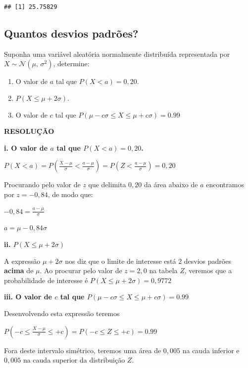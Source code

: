 \documentclass[
]{book}
\providecommand{\tightlist}{%
  \setlength{\itemsep}{0pt}\setlength{\parskip}{0pt}}
\begin{document}
\begin{verbatim}
## [1] 25.75829
\end{verbatim}

\hypertarget{quantos-desvios-padruxf5es}{%
\subsection{Quantos desvios padrões?}\label{quantos-desvios-padruxf5es}}

Suponha uma variável aleatória normalmente distribuída representada por \(X \sim \mathcal{N}(\mu,\,\sigma^2)\), determine:

\begin{enumerate}
\def\labelenumi{\roman{enumi}.}
\tightlist
\item
  O valor de \(a\) tal que \(P(X < a) = 0,20\).
\item
  \(P(X \le \mu + 2\sigma)\).
\item
  O valor de \(c\) tal que \(P(\mu -c\sigma \le X \le \mu +c\sigma) = 0.99\)
\end{enumerate}

\textbf{RESOLUÇÃO}

\textbf{i. O valor de \(a\) tal que \(P(X < a) = 0,20\).}

\(P(X < a) = P(\frac{X - \mu}{\sigma} < \frac{a - \mu}{\sigma}) = P(Z < \frac{a - \mu}{\sigma}) = 0,20\)

Procurando pelo valor de \(z\) que delimita \(0,20\) da área abaixo de \(a\) encontramos por \(z = -0,84\), de modo que:

\(-0,84 = \frac{a - \mu}{\sigma}\)

\(a = \mu -0,84\sigma\)

\textbf{ii. \(P(X \le \mu + 2\sigma)\)}

A expressão \(\mu + 2\sigma\) nos diz que o limite de interesse está \(2\) desvios padrões \textbf{acima} de \(\mu\). Ao procurar pelo valor de \(z = 2,0\) na tabela \(Z\), veremos que a probabilidade de interesse é \(P(X \le \mu + 2\sigma) = 0,9772\)

\textbf{iii. O valor de \(c\) tal que \(P(\mu -c\sigma \le X \le \mu +c\sigma) = 0.99\)}

Desenvolvendo esta expressão teremos

\(P(-c \le \frac{X - \mu}{\sigma} \le +c) = P(-c \le Z \le +c) = 0.99\)

Fora deste intervalo simétrico, teremos uma área de \(0,005\) na cauda inferior e \(0,005\) na cauda superior da distribuição \(Z\).
\end{document}
